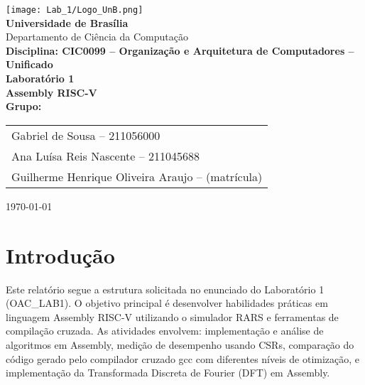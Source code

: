 \documentclass[12pt,a4paper]{article}
\begin{document}
\begin{titlepage}
    \begin{center}
        \vspace*{1cm}
        \texttt{[image: Lab\_1/Logo\_UnB.png]}\\[1cm]

        {\LARGE \textbf{Universidade de Brasília}}\\[4pt]
        {\large Departamento de Ciência da Computação}\\[12pt]
        {\Large \textbf{Disciplina: CIC0099 -- Organização e Arquitetura de Computadores -- Unificado}}\\[20pt]

        {\huge \textbf{Laboratório 1}}\\[6pt]
        {\Large \textbf{Assembly RISC-V}}\\[2cm]

        \textbf{Grupo:} \\[4pt]
        \begin{tabular}{l}
            
            Gabriel de Sousa -- 211056000 \\
            Ana Luísa Reis Nascente -- 211045688 \\
            Guilherme Henrique Oliveira Araujo -- (matrícula) \\
            
        \end{tabular}

        \vfill

        

        \vspace{0.8cm}
        \today
    \end{center}
\end{titlepage}

\tableofcontents
\newpage


\section*{Introdução}

Este relatório segue a estrutura solicitada no enunciado do Laboratório 1 (OAC\_LAB1). O objetivo principal é desenvolver habilidades práticas em linguagem Assembly RISC-V utilizando o simulador RARS e ferramentas de compilação cruzada. As atividades envolvem: implementação e análise de algoritmos em Assembly, medição de desempenho usando CSRs, comparação do código gerado pelo compilador cruzado gcc com diferentes níveis de otimização, e implementação da Transformada Discreta de Fourier (DFT) em Assembly.
\end{document}
